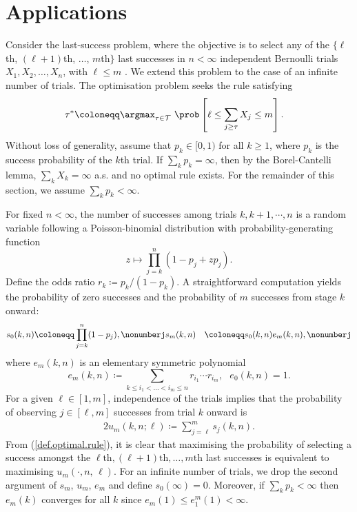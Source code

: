 \documentclass[11pt]{article}
\begin{document}
\section{Applications}\label{sec5}
Consider the last-success problem, where the objective is to select any of the \( \{\ell\)th, \( (\ell+1)\)th, \(\dots\), \( m\)th\( \} \) last successes in \( n < \infty \) independent Bernoulli trials \( X_1, X_2, \dots, X_n \), with \( \ell \leq m \) \cite{MatsuiAno}. We extend this problem to the case of an infinite number of trials. The optimisation problem seeks the rule satisfying
\begin{alignat}{2}\label{def.optimal.rule}
	\tau^* &\coloneqq \argmax_{\tau \in {\cal T}}~ \prob\left[\ell \le \sum_{j \ge \tau} X_j \le m\right].
\end{alignat}
Without loss of generality, assume that $p_k \in [0,1)$  for all $k\ge1$, where $p_k$ is the success probability of the $k$th trial. If $\sum_{k} p_k = \infty$, then by the Borel-Cantelli lemma, $\sum_k X_k = \infty$ a.s. and no optimal rule exists. For the remainder of this section, we assume $\sum_k p_k < \infty$. 


For fixed $n < \infty$, the number of successes among trials $k, k+1,\cdots, n$ is a random variable 
following a Poisson-binomial distribution with probability-generating function
$$z \mapsto \prod_{j=k}^n (1-p_j+zp_j).$$
Define the odds ratio $r_{k}\coloneqq {p_k}/{(1-p_k)}$.   A straightforward computation yields the probability of zero successes and the probability of $m$ successes from stage $k$ onward:
\begin{equation}
	\begin{aligned}
		s_0(k, n)&\coloneqq\prod_{j = k}^n (1-p_j),\nonumberj
		s_m(k, n)&\coloneqq s_0(k, n)e_m(k, n), \nonumberj%
	\end{aligned}
\end{equation}
where $e_m(k, n)$ is an elementary symmetric polynomial
\begin{equation*}
	e_{m}(k, n)\coloneqq\sum_{k \le i_1 < \ldots <i_m \le n} r_{i_1}\cdots r_{i_m}, ~~~e_{0}(k, n)=1.
\end{equation*}
For a given $\ell \in [1,m]$, independence of the trials implies that the probability of observing $j \in [\ell, m]$  successes  from trial $k$ onward is
\begin{alignat}{2}\label{uml}
	u_m(k, n; \ell) \coloneqq \sum_{j=\ell}^m s_j(k, n).
\end{alignat} 
From (\ref{def.optimal.rule}), it is clear that maximising the probability of selecting a success amongst the  $\ell\text{th}, (\ell+1)\text{th}, \ldots, m\text{th}$ last successes is equivalent to maximising $u_m(\cdot, n,\, \ell)$. For an infinite number of trials,  we drop the second argument of $s_m$, $u_m$, $e_m$ and define $s_0(\infty)=0$.  Moreover, if $\sum_k p_k < \infty$ then $e_m(k)$ converges for all $k$ since  $e_m(1) \le  e^m_1(1) < \infty$.  
\end{document}
